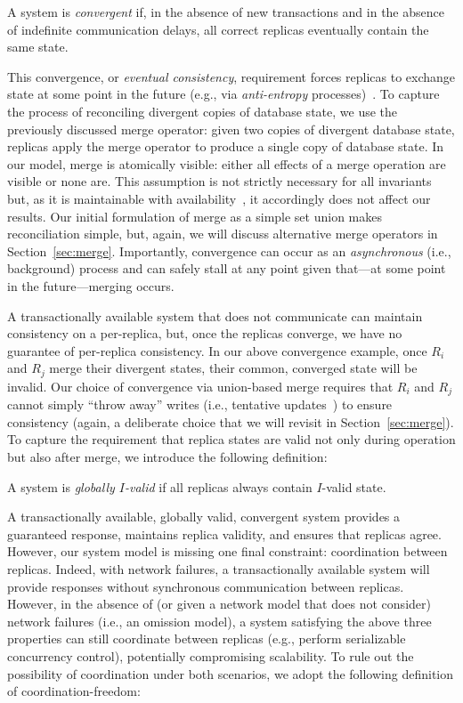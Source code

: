 \begin{definition}A system is \textit{convergent} if, in the
absence of new transactions and in the absence of indefinite
communication delays, all correct replicas eventually contain the same
state.
\end{definition}

This convergence, or \textit{eventual consistency}, requirement forces
replicas to exchange state at some point in the future (e.g., via
\textit{anti-entropy} processes)~\cite{vogels-defs,bayou}. To capture
the process of reconciling divergent copies of database state, we use
the previously discussed merge operator: given two copies of divergent
database state, replicas apply the merge operator to produce a single
copy of database state. In our model, merge is atomically visible:
either all effects of a merge operation are visible or none are. This
assumption is not strictly necessary for all invariants but, as it is
maintainable with availability~\cite{ramp-txns}, it accordingly does
not affect our results. Our initial formulation of merge as a simple
set union makes reconciliation simple, but, again, we will discuss
alternative merge operators in Section~\ref{sec:merge}. Importantly,
convergence can occur as an \textit{asynchronous} (i.e., background)
process and can safely stall at any point given that---at some point
in the future---merging occurs.

 A transactionally available system
that does not communicate can maintain consistency on a per-replica,
but, once the replicas converge, we have no guarantee of per-replica
consistency. In our above convergence example, once $R_i$ and $R_j$
merge their divergent states, their common, converged state will be
invalid. Our choice of convergence via union-based merge requires that
$R_i$ and $R_j$ cannot simply ``throw away'' writes (i.e., tentative
updates~\cite{tamer-book}) to ensure consistency (again, a deliberate
choice that we will revisit in Section~\ref{sec:merge}). To capture
the requirement that replica states are valid not only during
operation but also after merge, we introduce the following definition:

\begin{definition}
A system is \textit{globally $I$-valid} if all replicas always contain
$I$-valid state.
\end{definition}

 A transactionally available, globally valid,
convergent system provides a guaranteed response, maintains replica
validity, and ensures that replicas agree. However, our system model
is missing one final constraint: coordination between
replicas. Indeed, with network failures, a transactionally available
system will provide responses without synchronous communication
between replicas. However, in the absence of (or given a network model
that does not consider) network failures (i.e., an omission model), a
system satisfying the above three properties can still coordinate
between replicas (e.g., perform serializable concurrency control),
potentially compromising scalability. To rule out the possibility of
coordination under both scenarios, we adopt the following definition
of coordination-freedom:

